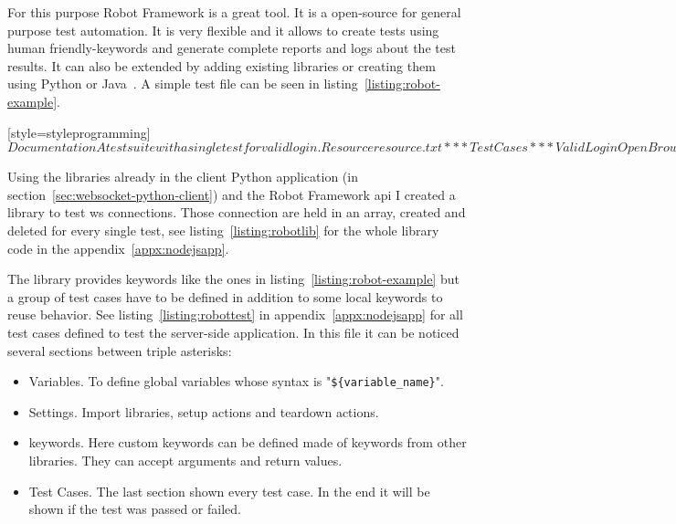 \documentclass[hidelinks,11pt,a4paper,oneside,article]{memoir}
\begin{document}
For this purpose Robot Framework is a great tool. It is a open-source for general purpose test automation. It is very flexible and it allows to create tests using human friendly-keywords and generate complete reports and logs about the test results. It can also be extended by adding existing libraries or creating them using Python or Java~\cite{robotframe}.
A simple test file can be seen in listing~\ref{listing:robot-example}.

[style=styleprogramming]$
Documentation     A test suite with a single test for valid login.
Resource          resource.txt

*** Test Cases ***
Valid Login
Open Browser To Login Page
Input Username    demo
Input Password    mode
Submit Credentials
Welcome Page Should Be Open
[Teardown]    Close Browser
$

Using the libraries already in the client Python application (in section~\ref{sec:websocket-python-client}) and the Robot Framework \gls{api} I created a library to test \gls{ws} connections. Those connection are held in an array, created and deleted for every single test, see listing~\ref{listing:robotlib} for the whole library code in the appendix~\ref{appx:nodejsapp}.

The library provides keywords like the ones in listing~\ref{listing:robot-example} but a group of test cases have to be defined in addition to some local keywords to reuse behavior. See listing~\ref{listing:robottest} in appendix~\ref{appx:nodejsapp} for all test cases defined to test the server-side application. In this file it can be noticed several sections between triple asterisks:
\begin{itemize}
    \item Variables. To define global variables whose syntax is "\texttt{\$\{variable\_name\}}".
    \item Settings. Import libraries, setup actions and teardown actions.
    \item keywords. Here custom keywords can be defined made of keywords from other libraries. They can accept arguments and return values.
    \item Test Cases. The last section shown every test case. In the end it will be shown if the test was passed or failed.
\end{itemize}
\end{document}
